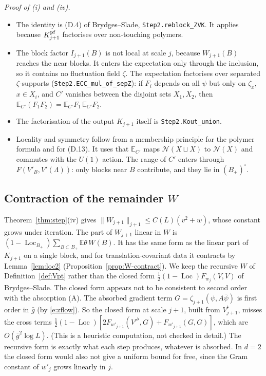 \documentclass[11pt]{amsart}
\theoremstyle{definition}
\theoremstyle{remark}
\numberwithin{equation}{section}
\newcommand{\E}{\mathbb{E}}
\newcommand{\cN}{\mathcal{N}}
\newcommand{\Loc}{\operatorname{Loc}}
\begin{document}
\emph{Proof of (i) and (iv).}
\begin{itemize}
\item The identity is (D.4) of Brydges--Slade, \texttt{Step2.reblock\_ZVK}. It applies because
  $K^{\rm pf}_{j+1}$ factorises over non-touching polymers.
\item The block factor $I_{j+1}(B)$ is not local at scale $j$, because $W_{j+1}(B)$ reaches the
  near blocks. It enters the expectation only through the inclusion, so it contains no
  fluctuation field $\zeta$. The expectation factorises over separated $\zeta$-supports
  (\texttt{Step2.ECC\_mul\_of\_sepZ}): if $F_i$ depends on all $\psi$ but only on $\zeta_x$,
  $x\in X_i$, and $C'$ vanishes between the disjoint sets $X_1,X_2$, then
  $\E_{C'}(F_1F_2)=\E_{C'}F_1\,\E_{C'}F_2$.
\item The factorisation of the output $K_{j+1}$ itself is \texttt{Step2.Kout\_union}.
\item Locality and symmetry follow from a membership principle for the polymer formula and for
  (D.13). It uses that $\E_{C'}$ maps $\cN(X\sqcup X)$ to $\cN(X)$ and commutes with the $U(1)$
  action. The range of $C'$ enters through $F(V'_B,V'(\Lambda))$: only blocks near $B$
  contribute, and they lie in $(B_+)^\square$.
\end{itemize}

\subsection{Contraction of the remainder $W$}
\label{sec:W-contract}
Theorem~\ref{thm:step}(iv) gives $\|W_{j+1}\|_{j+1}\le C(L)(v^2+w)$, whose constant grows
under iteration. The part of $W_{j+1}$ linear in $W$ is
$(1-\Loc_{B_+})\sum_{B\subset B_+}\E\theta\,W(B)$. It has the same form as the linear part of
$K_{j+1}$ on a single block, and for translation-covariant data it contracts by
Lemma~\ref{lem:loc2} (Proposition~\ref{prop:W-contract}). We keep the recursive $W$ of Definition~\ref{def:Vpt} rather than the
closed form $\frac12(1-\Loc)F_{w_j}(V,V)$ of Brydges--Slade. The closed form appears not to be
consistent to second order with the absorption (A). The absorbed gradient term
$G=\zeta_{j+1}(\psi,A\bar\psi)$ is first order in $\bar g$ (by \eqref{e:zflow}). So the closed form
at scale $j+1$, built from $V^\flat_{j+1}$, misses the cross terms
$\frac12(1-\Loc)[2F_{w'_{j+1}}(V'^\flat,G)+F_{w'_{j+1}}(G,G)]$, which are $O(\bar g^2\log L)$.
(This is a heuristic computation, not checked in detail.) The recursive form is exactly what
each step produces, whatever is absorbed. In $d=2$ the closed form would also not give a
uniform bound for free, since the Gram constant of $w'_j$ grows linearly in $j$.
\end{document}
